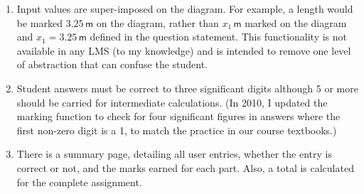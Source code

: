 \documentclass{tufte-handout}
\begin{document}
\begin{enumerate}
	\resume
	\item Input values are super-imposed on the diagram. For example, a length would be marked $3.25\,\textsf{m}$ on the diagram, rather than $x_1\,\textsf{m}$ marked on the diagram and $x_1=3.25\,\textsf{m}$ defined in the question statement. This functionality is not available in any LMS (to my knowledge) and is intended to remove one level of abstraction that can confuse the student.
	\item Student answers must be correct to three significant digits although 5 or more should be carried for intermediate calculations. (In 2010, I updated the marking function to check for four significant figures in answers where the first non-zero digit is a 1, to match the practice in our course textbooks.)
	\item There is a summary page, detailing all user entries, whether the entry is correct or not, and the marks earned for each part. Also, a total is calculated for the complete assignment.

\end{enumerate}
\end{document}
